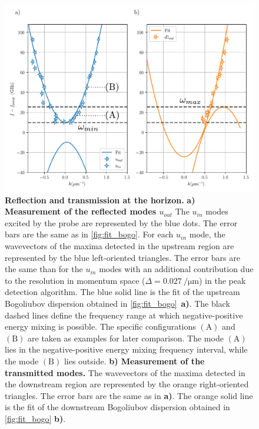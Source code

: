 \begin{figure}
    \centering
    \includegraphics[width=1\textwidth]{chap_stimulated_hawking/fig/fit_bogo_RT.pdf}
    \caption{
    \textbf{Reflection and transmission at the horizon.}
    \textbf{a) Measurement of the reflected modes $u_{out}$} The $u_{in}$ modes excited by the probe are represented by the blue dots. The error bars are the same as in \autoref{fig:fit_bogo}. For each $u_{in}$ mode,
    the wavevectors of the maxima detected in the upstream region are represented by the blue left-oriented triangles. The error bars are the same than for the $u_{in}$ modes with an additional contribution due to the resolution in momentum space ($\Delta=\SI{0.027}{\per \micro \meter}$) in the peak detection algorithm.
    The blue solid line is the fit of the upstream Bogoliubov dispersion obtained in \autoref{fig:fit_bogo}~\textbf{a)}.
    The black dashed lines define the frequency range at which negative-positive energy mixing is possible.
    The specific configurations $\mathrm{(A)}$ and $\mathrm{(B)}$ are taken as examples for later comparison. The mode $\mathrm{(A)}$ lies in the negative-positive energy mixing frequency interval, while the mode $\mathrm{(B)}$ lies outside.
    \textbf{b) Measurement of the transmitted modes.} The wavevectors of the maxima detected in the downstream region are represented by the orange right-oriented triangles. The error bars are the same as in \textbf{a)}. 
    The orange solid line is the fit of the downstream Bogoliubov dispersion obtained in \autoref{fig:fit_bogo} \textbf{b)}. }
    \label{fig:fit_bogo_RT}
\end{figure}

